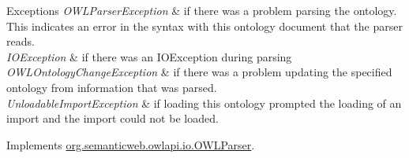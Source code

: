 \begin{DoxyExceptions}{Exceptions}
{\em O\-W\-L\-Parser\-Exception} & if there was a problem parsing the ontology. This indicates an error in the syntax with this ontology document that the parser reads. \\
\hline
{\em I\-O\-Exception} & if there was an I\-O\-Exception during parsing \\
\hline
{\em O\-W\-L\-Ontology\-Change\-Exception} & if there was a problem updating the specified ontology from information that was parsed. \\
\hline
{\em Unloadable\-Import\-Exception} & if loading this ontology prompted the loading of an import and the import could not be loaded. \\
\hline
\end{DoxyExceptions}


Implements \hyperlink{interfaceorg_1_1semanticweb_1_1owlapi_1_1io_1_1_o_w_l_parser_a259739c6baf94f4e5a2dad5d0400f07a}{org.\-semanticweb.\-owlapi.\-io.\-O\-W\-L\-Parser}.

